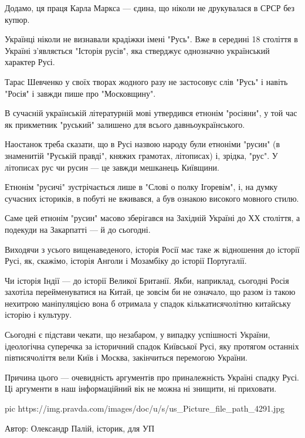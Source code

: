 Додамо, ця праця Карла Маркса --- єдина, що ніколи не друкувалася в СРСР без
купюр.

Українці ніколи не визнавали крадіжки імені "Русь". Вже в середині 18 століття
в Україні з'являється "Історія русів", яка стверджує однозначно український
характер Русі.

Тарас Шевченко у своїх творах жодного разу не застосовує слів "Русь" і навіть
"Росія" і завжди пише про "Московщину".

В сучасній українській літературній мові утвердився етнонім "росіяни", у той
час як прикметник "руський" залишено для всього давньоукраїнського.

Наостанок треба сказати, що в Русі назвою народу були етноніми "русин" (в
знаменитій "Руській правді", княжих грамотах, літописах) і, зрідка, "рус". У
літописах рус чи русин --- це завжди мешканець Київщини.

Етнонім "русичі" зустрічається лише в "Слові о полку Ігоревім", і, на думку
сучасних істориків, в побуті не вживався, а був ознакою високого мовного стилю.

Саме цей етнонім "русин" масово зберігався на Західній Україні до ХХ століття,
а подекуди на Закарпатті --- й до сьогодні.

Виходячи з усього вищенаведеного, історія Росії має таке ж відношення до
історії Русі, як, скажімо, історія Анголи і Мозамбіку до історії Португалії.

Чи історія Індії --- до історії Великої Британії. Якби, наприклад, сьогодні Росія
захотіла перейменуватися на Китай, це зовсім би не означало, що разом із такою
нехитрою маніпуляцією вона б отримала у спадок кількатисячолітню китайську
історію і культуру.

Сьогодні є підстави чекати, що незабаром, у випадку успішності України,
ідеологічна суперечка за історичний спадок Київської Русі, яку протягом
останніх півтисячоліття вели Київ і Москва, закінчиться перемогою України.

Причина цього --- очевидність аргументів про приналежність Україні спадку Русі.
Ці аргументи в наш інформаційний вік не можна ні знищити, ні приховати.

\ifcmt
pic https://img.pravda.com/images/doc/u/s/us_Picture_file_path_4291.jpg
\fi

Автор: Олександр Палій, історик, для УП
